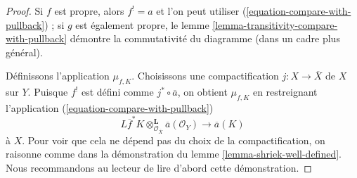 \begin{proof}
Si $f$ est propre, alors $f^! = a$ et l'on peut utiliser (\ref{equation-compare-with-pullback}) ; si $g$ est également propre, le lemme \ref{lemma-transitivity-compare-with-pullback} démontre la commutativité du diagramme (dans un cadre plus général).

\medskip\noindent
Définissons l'application $\mu_{f, K}$. Choisissons une compactification $j : X \to \overline{X}$ de $X$ sur $Y$. Puisque $f^!$ est défini comme $j^* \circ \overline{a}$, on obtient $\mu_{f, K}$ en restreignant l'application (\ref{equation-compare-with-pullback})
$$
L\overline{f}^*K \otimes_{\mathcal{O}_{\overline{X}}}^\mathbf{L}
\overline{a}(\mathcal{O}_Y)
\longrightarrow
\overline{a}(K)
$$
à $X$. Pour voir que cela ne dépend pas du choix de la compactification, on raisonne comme dans la démonstration du lemme \ref{lemma-shriek-well-defined}. Nous recommandons au lecteur de lire d'abord cette démonstration.


\end{proof}
